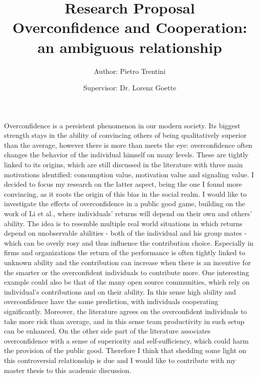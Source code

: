 \documentclass[11pt,twoside,a4paper,leqno]{article}
\begin{document}
\title{{\Huge \textbf{Research Proposal}}\\[0.5 cm]Overconfidence and Cooperation:\\an ambiguous relationship}
\date{}
\author{Author: Pietro Trentini \and Supervisor: Dr. Lorenz Goette}
\maketitle

Overconfidence is a persistent phenomenon in our modern society. Its biggest strength stays in the ability of convincing others of being qualitatively superior than the average, however there is more than meets the eye: overconfidence often changes the behavior of the individual himself on many levels. These are tightly linked to its origins, which are still discussed in the literature with three main motivations identified: consumption value, motivation value and signaling value\textsuperscript{\cite{Ben}}\textsuperscript{\cite{Burks}}. I decided to focus my research on the latter aspect, being the one I found more convincing, as it roots the origin of this bias in the social realm. I would like to investigate the effects of overconfidence in a public good game, building on the work of Li et al.\textsuperscript{\cite{Li}}, where individuals’ returns will depend on their own and others’ ability. The idea is to resemble multiple real world situations in which returns depend on unobservable abilities - both of the individual and his group mates - which can be overly rosy and thus influence the contribution choice. Especially in firms and organizations the return of the performance is often tightly linked to unknown ability and the contribution can increase when there is an incentive for the smarter or the overconfident individuals to contribute more. One interesting example could also be that of the many open source communities, which rely on individual's contributions and on their ability. In this sense high ability and overconfidence have the same prediction, with individuals cooperating significantly. Moreover, the literature agrees on the overconfident individuals to take more risk than average, and in this sense team productivity in such setup can be enhanced.  On the other side part of the literature associates overconfidence with a sense of superiority and self-sufficiency, which could harm the provision of the public good. Therefore I think that shedding some light on this controversial relationship is due and I would like to contribute with my master thesis to this academic discussion. 
\end{document}
